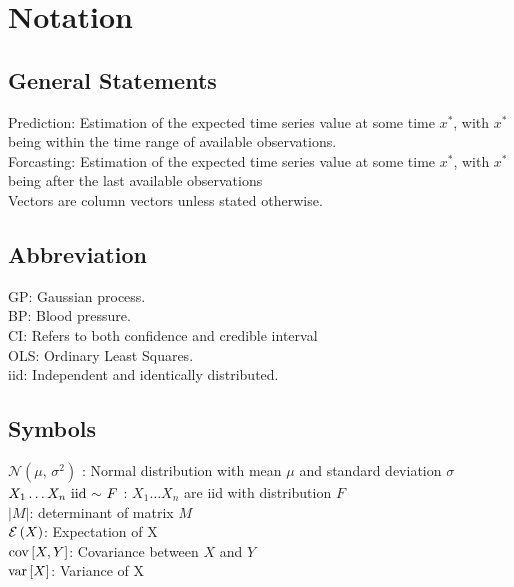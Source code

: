 \chapter*{Notation}
\label{c:Notation}


\section{General Statements}
Prediction: Estimation of the expected time series value at some time
$x^{\ast}$, with $x^{\ast}$ being within the time range of available observations.
\\
Forcasting: Estimation of the expected time series value at some time
$x^{\ast}$, with $x^{\ast}$ being after the last available observations \\
Vectors are column vectors unless stated otherwise.

\section{Abbreviation}\label{sec:abbreviation}
GP: Gaussian process. \\
BP: Blood pressure. \\
CI: Refers to both confidence and credible interval\\
OLS: Ordinary Least Squares. \\
iid: Independent and identically distributed.

\section{Symbols}\label{sec:symbols}
$\mathcal{N}(\mu,\,\sigma^{2})$ : Normal distribution with mean $\mu$ and standard deviation $\sigma$ \\
$X_1 \dots X_n \text{ iid }{\sim} \text{ } F$ : $X_1 \dots X_n$ are iid with distribution $F$ \\
$|M|$: determinant of matrix $M$ \\
$\ERW{X}$: Expectation of X \\
$\COV{X,Y}$: Covariance between $X$ and $Y$ \\
$\VAR{X}$: Variance of X


